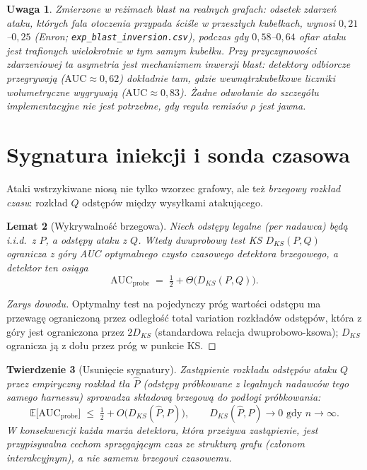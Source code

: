 \documentclass[11pt]{article}
\newtheorem{theorem}{Twierdzenie}
\newtheorem{lemma}[theorem]{Lemat}
\newtheorem{remark}[theorem]{Uwaga}
\newcommand{\E}{\mathbb{E}}
\begin{document}
\begin{remark}
Zmierzone w reżimach blast na realnych grafach: odsetek zdarzeń ataku,
których fala otoczenia przypada \emph{ściśle w przeszłych kubełkach},
wynosi $0{,}21$--$0{,}25$ (Enron; \texttt{exp\_blast\_inversion.csv}),
podczas gdy $0{,}58$--$0{,}64$ ofiar ataku jest trafionych wielokrotnie
\emph{w tym samym kubełku}. Przy przyczynowości zdarzeniowej ta
asymetria jest mechanizmem inwersji blast: detektory odbiorcze przegrywają
($\mathrm{AUC}\approx0{,}62$) dokładnie tam, gdzie wewnątrzkubełkowe
liczniki wolumetryczne wygrywają ($\mathrm{AUC}\approx0{,}83$). Żadne
odwołanie do szczegółu implementacyjne nie jest potrzebne, gdy reguła
remisów $\rho$ jest jawna.
\end{remark}

\section{Sygnatura iniekcji i sonda czasowa}
\label{sec:injection}

Ataki wstrzykiwane niosą nie tylko wzorzec grafowy, ale też
\emph{brzegowy rozkład czasu}: rozkład $Q$ odstępów między wysyłkami
atakującego.

\begin{lemma}[Wykrywalność brzegowa]
\label{lem:probe}
Niech odstępy legalne (per nadawca) będą i.i.d.\ z $P$, a odstępy ataku
z $Q$. Wtedy dwuprobowy test KS $D_{KS}(P,Q)$ ogranicza z góry AUC
optymalnego czysto czasowego detektora \emph{brzegowego}, a detektor ten
osiąga
\[
\mathrm{AUC}_{\mathrm{probe}} \;=\; \tfrac12 + \Theta\big(D_{KS}(P,Q)\big).
\]
\end{lemma}

\begin{proof}[Zarys dowodu]
Optymalny test na pojedynczy próg wartości odstępu ma przewagę
ograniczoną przez odległość total variation rozkładów odstępów,
która z góry jest ograniczona przez $2D_{KS}$ (standardowa relacja
dwuprobowo-ksowa); $D_{KS}$ ogranicza ją z dołu przez próg w punkcie KS.
\end{proof}

\begin{theorem}[Usunięcie sygnatury]
\label{thm:injection}
Zastąpienie rozkładu odstępów ataku $Q$ przez empiryczny rozkład tła
$\widehat P$ (odstępy próbkowane z legalnych nadawców tego samego
harnessu) sprowadza składową brzegową do podłogi próbkowania:
\[
\E\big[\mathrm{AUC}_{\mathrm{probe}}\big] \;\le\; \tfrac12 +
O\big(D_{KS}(\widehat P, P)\big),
\qquad D_{KS}(\widehat P,P)\to 0 \text{ gdy } n\to\infty.
\]
W konsekwencji każda marża detektora, która \emph{przeżywa} zastąpienie,
jest przypisywalna cechom sprzęgającym czas ze strukturą grafu
(członom interakcyjnym), a nie samemu brzegowi czasowemu.
\end{theorem}
\end{document}
